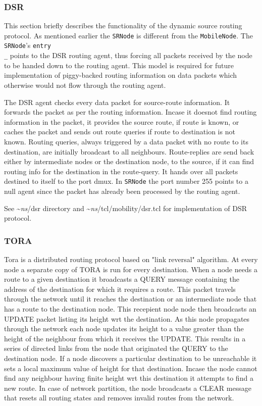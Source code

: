 \subsubsection{DSR}
\label{sec:dsr}

This section briefly describes the functionality of the dynamic source
routing protocol. As mentioned earlier the {\tt SRNode} is different from
the {\tt MobileNode}.  The {\tt SRNode}'s {\tt entry\\_} points to the
DSR routing agent, thus forcing all    
packets received by the node to be handed down to the routing agent. This
model is required for future implementation of piggy-backed routing
information on data packets which otherwise would not flow through the
routing agent.   

The DSR agent checks every data packet for source-route information. It
forwards the packet as per the routing information. Incase it doesnot find
routing information in the packet, it provides the source route, if route
is known, or caches the packet and   
sends out route queries if route to destination is not known. Routing
queries, always triggered by a data packet with no route to its
destination, are initially broadcast to all neighbours. Route-replies are
send back either by intermediate nodes or the 
destination node, to the source, if it can find routing info for the
destination in the route-query.  It hands over all packets destined to
itself to the port dmux.  
In {\tt SRNode} the port number 255 points to a null agent since the
packet has already been processed by the routing agent. 

See \textasciitilde\emph{ns}/{dsr} directory and \textasciitilde\emph{ns}/{tcl/mobility/dsr.tcl} for implementation
of DSR protocol. 

\subsubsection{TORA}
\label{sec:tora}

Tora is a distributed routing protocol based on "link reversal" algorithm. 
At every node a separate copy of TORA is run for every destination. When a
node needs a route to a given destination it broadcasts a QUERY message
containing the address of the destination for which it requires  a route.
This packet travels through the network until it reaches the destination
or an intermediate node that has a route to the destination node.
This recepient node node then broadcasts an UPDATE packet listing its
height wrt the destination. As this node propagates through the network
each node updates its height to a value greater than the height of the
neighbour from which it receives the UPDATE. This results in a series of
directed links from the node that originated the QUERY to the destination
node. If a node discovers a particular destination to be unreachable it
sets a local maximum value of height for that destination. Incase the node
cannot find any neighbour having finite height wrt this destination it
attempts to find a new route. In case of network partition, the node
broadcasts a CLEAR message that resets all routing states and removes
invalid routes from the network.


